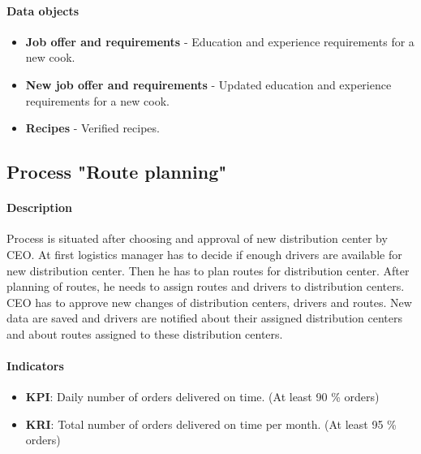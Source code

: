 \documentclass[11pt,a4paper]{article}
\begin{document}
\paragraph{Data objects}

\begin{itemize}
    \item \textbf{Job offer and requirements} - Education and experience requirements for a new cook.
    \item \textbf{New job offer and requirements} - Updated education and experience requirements for a new cook.
    \item \textbf{Recipes} - Verified recipes.
\end{itemize}

\newpage




\subsection{Process "Route planning"}

\paragraph{Description}

Process is situated after choosing and approval of new distribution center by CEO. At first logistics manager has to decide if enough drivers are available for new distribution center. Then he has to plan routes for distribution center. After planning of routes, he needs to assign routes and drivers to distribution centers. CEO has to approve new changes of distribution centers, drivers and routes. New data are saved and drivers are notified about their assigned distribution centers and about routes assigned to these distribution centers.

\paragraph{Indicators}

\begin{itemize}
    \item \textbf{KPI}: Daily number of orders delivered on time. (At least 90 \% orders)
    \item \textbf{KRI}: Total number of orders delivered on time per month. (At least 95 \% orders)
\end{itemize}
\end{document}
